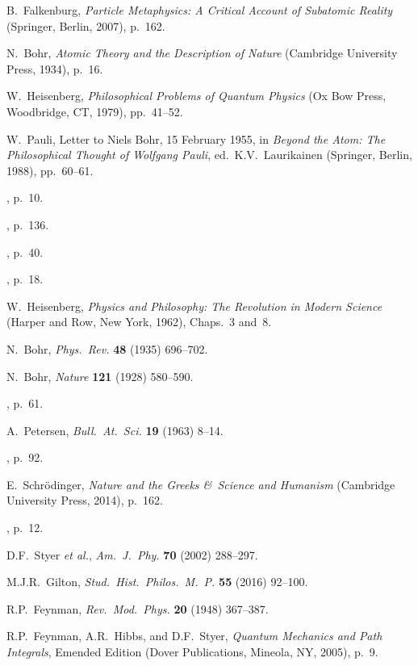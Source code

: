 \documentclass[12pt]{article}
\begin{document}
\begin{thebibliography}{99}
 B.\ Falkenburg, \textit{Particle Metaphysics: A Critical Account of Subatomic Reality} (Springer, Berlin, 2007), p.~162.

 N.\ Bohr, \emph{Atomic Theory and the Description of Nature} (Cambridge University Press, 1934), p.~16.

 W.\ Heisenberg, \textit{Philosophical Problems of Quantum Physics} (Ox Bow Press, Woodbridge, CT, 1979), pp.\ 41--52.

 W.\ Pauli, Letter to Niels Bohr, 15 February 1955, in \textit{Beyond the Atom: The Philosophical Thought of Wolfgang Pauli}, ed.\ K.V.\ Laurikainen (Springer, Berlin, 1988), pp.\ 60--61.

 \cite{Bohr-EAPHK}, p.~10.

 \cite{KantCPR1}, p.~136.

 \cite{Bohr-APHK}, p.~40.

 \cite{BohrATDN}, p.~18.

 W.\ Heisenberg, \textit{Physics and Philosophy: The Revolution in Modern Science} (Harper and Row, New York, 1962), Chaps.\ 3 and~8.

 N.\ Bohr, \textit{Phys.\ Rev.} \textbf{48} (1935) 696--702.

 N.\ Bohr, \textit{Nature} \textbf{121} (1928) 580--590.

 \cite{Bohr-APHK}, p.~61.

 A.\ Petersen, \textit{Bull.\ At.\ Sci.} \textbf{19} (1963) 8--14.

 \cite{BohrE58-62}, p.~92.

 E.\ Schr\"odinger, \textit{Nature and the Greeks \&\ Science and Humanism} (Cambridge University Press, 2014), p.~162.

 \cite{Bohr-EAPHK}, p.~12.

 D.F.\ Styer \emph{et al.}, \textit{Am.\ J.\ Phy.} \textbf{70} (2002) 288--297.

 M.J.R.\ Gilton, \textit{Stud.\ Hist.\ Philos.\ M.\ P.} \textbf{55} (2016) 92--100.

 R.P.\ Feynman, \emph{Rev.\ Mod.\ Phys.} \textbf{20} (1948) 367--387.

 R.P.\ Feynman, A.R.\ Hibbs, and D.F.\ Styer, \emph{Quantum Mechanics and Path Integrals}, Emended Edition (Dover Publications, Mineola, NY, 2005), p.~9.


\end{thebibliography}
\end{document}
